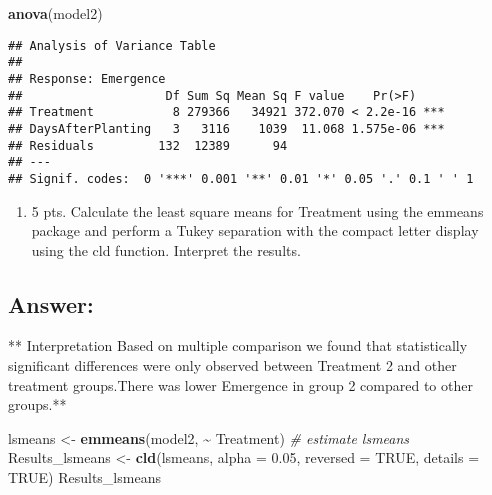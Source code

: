 \documentclass[
]{article}
\newenvironment{Shaded}{\begin{snugshade}}{\end{snugshade}}
\newcommand{\AttributeTok}[1]{\textcolor[rgb]{0.13,0.29,0.53}{#1}}
\newcommand{\CommentTok}[1]{\textcolor[rgb]{0.56,0.35,0.01}{\textit{#1}}}
\newcommand{\ConstantTok}[1]{\textcolor[rgb]{0.56,0.35,0.01}{#1}}
\newcommand{\FloatTok}[1]{\textcolor[rgb]{0.00,0.00,0.81}{#1}}
\newcommand{\FunctionTok}[1]{\textcolor[rgb]{0.13,0.29,0.53}{\textbf{#1}}}
\newcommand{\NormalTok}[1]{#1}
\newcommand{\OtherTok}[1]{\textcolor[rgb]{0.56,0.35,0.01}{#1}}
\newcommand{\SpecialCharTok}[1]{\textcolor[rgb]{0.81,0.36,0.00}{\textbf{#1}}}
\providecommand{\tightlist}{%
  \setlength{\itemsep}{0pt}\setlength{\parskip}{0pt}}
\begin{document}
\begin{Shaded}
\begin{Highlighting}[]
\FunctionTok{anova}\NormalTok{(model2)}
\end{Highlighting}
\end{Shaded}

\begin{verbatim}
## Analysis of Variance Table
## 
## Response: Emergence
##                    Df Sum Sq Mean Sq F value    Pr(>F)    
## Treatment           8 279366   34921 372.070 < 2.2e-16 ***
## DaysAfterPlanting   3   3116    1039  11.068 1.575e-06 ***
## Residuals         132  12389      94                      
## ---
## Signif. codes:  0 '***' 0.001 '**' 0.01 '*' 0.05 '.' 0.1 ' ' 1
\end{verbatim}

\begin{enumerate}
\def\labelenumi{\arabic{enumi}.}
\setcounter{enumi}{3}
\tightlist
\item
  5 pts. Calculate the least square means for Treatment using the
  emmeans package and perform a Tukey separation with the compact letter
  display using the cld function. Interpret the results.
\end{enumerate}

\subsection{Answer:}\label{answer-1}

** Interpretation \textbf{ }Based on multiple comparison we found that
statistically significant differences were only observed between
Treatment 2 and other treatment groups.There was lower Emergence in
group 2 compared to other groups.**

\begin{Shaded}
\begin{Highlighting}[]
\NormalTok{lsmeans }\OtherTok{\textless{}{-}} \FunctionTok{emmeans}\NormalTok{(model2, }\SpecialCharTok{\textasciitilde{}}\NormalTok{ Treatment) }\CommentTok{\# estimate lsmeans}
\NormalTok{Results\_lsmeans }\OtherTok{\textless{}{-}} \FunctionTok{cld}\NormalTok{(lsmeans, }\AttributeTok{alpha =} \FloatTok{0.05}\NormalTok{, }\AttributeTok{reversed =} \ConstantTok{TRUE}\NormalTok{, }\AttributeTok{details =} \ConstantTok{TRUE}\NormalTok{) }
\NormalTok{Results\_lsmeans}
\end{Highlighting}
\end{Shaded}
\end{document}
